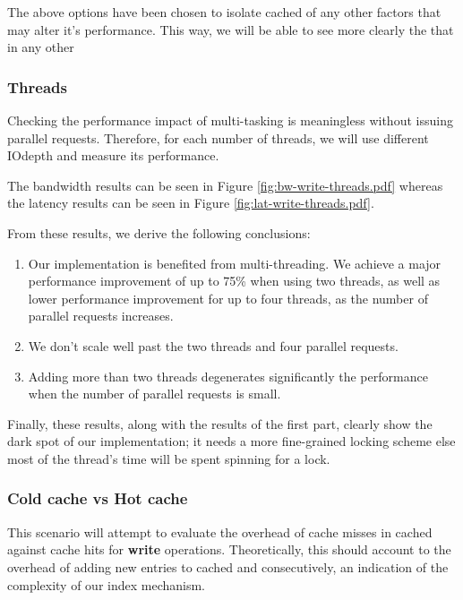 The above options have been chosen to isolate cached of any other factors that 
may alter it's performance. This way, we will be able to see more clearly the   
that in any other

\subsubsection{Threads}

Checking the performance impact of multi-tasking is meaningless without issuing
parallel requests. Therefore, for each number of threads, we will use different 
IOdepth and measure its performance.

The bandwidth results can be seen in Figure \ref{fig:bw-write-threads.pdf} 
whereas the latency results can be seen in Figure 
\ref{fig:lat-write-threads.pdf}.


From these results, we derive the following conclusions:

\begin{enumerate}
	\item Our implementation is benefited from multi-threading. We achieve 
		a major performance improvement of up to 75\% when using two 
		threads, as well as lower performance improvement for up to 
		four threads, as the number of parallel requests increases.
	\item We don't scale well past the two threads and four parallel 
		requests.
	\item Adding more than two threads degenerates significantly the 
		performance when the number of parallel requests is small.
\end{enumerate}

Finally, these results, along with the results of the first part, clearly show 
the dark spot of our implementation; it needs a more fine-grained locking 
scheme else most of the thread's time will be spent spinning for a lock.

\subsubsection{Cold cache vs Hot cache}

This scenario will attempt to evaluate the overhead of cache misses in cached
against cache hits for \textbf{write} operations. Theoretically, this should 
account to the overhead of adding new entries to cached and consecutively, an 
indication of the complexity of our index mechanism.

